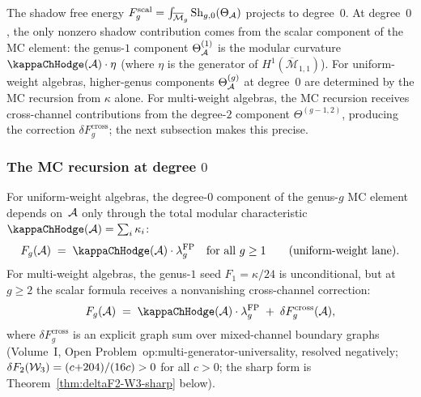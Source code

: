 \begin{remark}
\label{rem:degree-0-projection}
The shadow free energy $F_g^{\mathrm{scal}} =
\int_{\overline{\mathcal{M}}_g} \mathrm{Sh}_{g,0}(\Theta_{\mathcal{A}})$ projects
to degree~$0$. At degree~$0$, the only nonzero shadow
contribution comes from the scalar component of the MC element:
the genus-$1$ component $\Theta^{(1)}_{\mathcal{A}}$ is the modular
curvature $\kappaChHodge(\cA) \cdot \eta$ (where $\eta$ is the generator
of $H^1(\overline{\mathcal{M}}_{1,1})$). For uniform-weight
algebras, higher-genus components $\Theta^{(g)}_{\mathcal{A}}$ at degree~$0$
are determined by the MC recursion from $\kappa$ alone.
For multi-weight algebras, the MC recursion receives
cross-channel contributions from the degree-$2$ component
$\Theta^{(g-1,2)}$, producing the correction
$\delta F_g^{\mathrm{cross}}$; the next subsection makes this
precise.
\end{remark}

\subsubsection{The MC recursion at degree $0$}

\begin{proposition}
\label{prop:degree-0-weight-independence}
For uniform-weight algebras, the degree-$0$ component of the
genus-$g$ MC element depends on~$\mathcal{A}$ only through the total
modular characteristic $\kappaChHodge(\cA) = \sum_i \kappa_i$:
\begin{equation}\label{eq:Fg-scalar-factorization}
F_g(\cA) \;=\; \kappaChHodge(\cA) \cdot \lambda_g^{\mathrm{FP}}
\quad\text{for all } g \geq 1
\qquad\textup{(uniform-weight lane)}.
\end{equation}
For multi-weight algebras, the genus-$1$ seed
$F_1 = \kappa/24$ is unconditional, but at $g \geq 2$ the
scalar formula receives a nonvanishing cross-channel correction:
\begin{equation}\label{eq:Fg-cross-channel-decomposition}
F_g(\cA) \;=\; \kappaChHodge(\cA) \cdot \lambda_g^{\mathrm{FP}}
\;+\; \delta F_g^{\mathrm{cross}}(\cA),
\end{equation}
where $\delta F_g^{\mathrm{cross}}$ is an explicit graph sum
over mixed-channel boundary graphs
\textup{(}Volume~I, Open Problem~op:multi-generator-universality,
resolved negatively; $\delta F_2(\mathcal{W}_3) = (c{+}204)/(16c) > 0$
for all $c > 0$; the sharp form is
Theorem~\ref{thm:deltaF2-W3-sharp} below\textup{)}.
\end{proposition}

